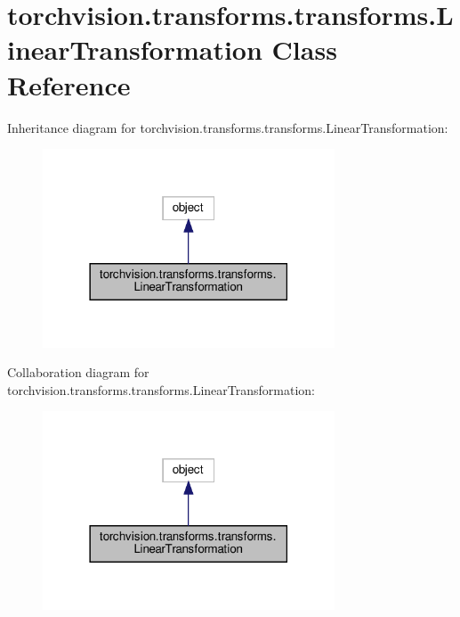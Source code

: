 \hypertarget{classtorchvision_1_1transforms_1_1transforms_1_1LinearTransformation}{}\section{torchvision.\+transforms.\+transforms.\+Linear\+Transformation Class Reference}
\label{classtorchvision_1_1transforms_1_1transforms_1_1LinearTransformation}


Inheritance diagram for torchvision.\+transforms.\+transforms.\+Linear\+Transformation\+:
\nopagebreak
\begin{figure}[H]
\begin{center}
\leavevmode
\includegraphics[width=246pt]{classtorchvision_1_1transforms_1_1transforms_1_1LinearTransformation__inherit__graph}
\end{center}
\end{figure}


Collaboration diagram for torchvision.\+transforms.\+transforms.\+Linear\+Transformation\+:
\nopagebreak
\begin{figure}[H]
\begin{center}
\leavevmode
\includegraphics[width=246pt]{classtorchvision_1_1transforms_1_1transforms_1_1LinearTransformation__coll__graph}
\end{center}
\end{figure}
